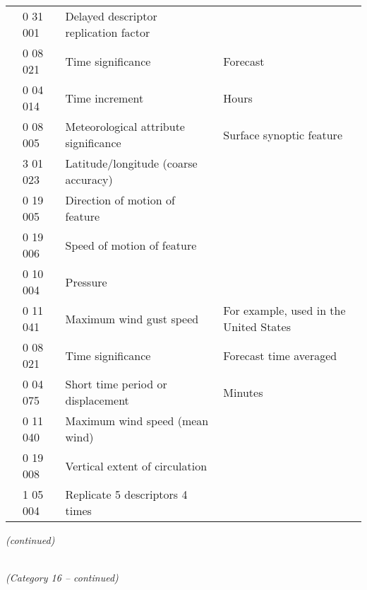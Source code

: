 \begin{longtable}[]{@{}llll@{}}
& 0 31 001 & Delayed descriptor replication factor &\tabularnewline
& 0 08 021 & Time significance & Forecast\tabularnewline
& 0 04 014 & Time increment & Hours\tabularnewline
& 0 08 005 & Meteorological attribute significance & Surface synoptic feature\tabularnewline
& 3 01 023 & Latitude/longitude (coarse accuracy) &\tabularnewline
& 0 19 005 & Direction of motion of feature &\tabularnewline
& 0 19 006 & Speed of motion of feature &\tabularnewline
& 0 10 004 & Pressure &\tabularnewline
& 0 11 041 & Maximum wind gust speed & For example, used in the United States\tabularnewline
& 0 08 021 & Time significance & Forecast time averaged\tabularnewline
& 0 04 075 & Short time period or displacement & Minutes\tabularnewline
& 0 11 040 & Maximum wind speed (mean wind) &\tabularnewline
& 0 19 008 & Vertical extent of circulation &\tabularnewline
& 1 05 004 & Replicate 5 descriptors 4 times &\tabularnewline
\bottomrule
\end{longtable}

\emph{(continued)}

\emph{\\
(Category 16 -- continued)}

